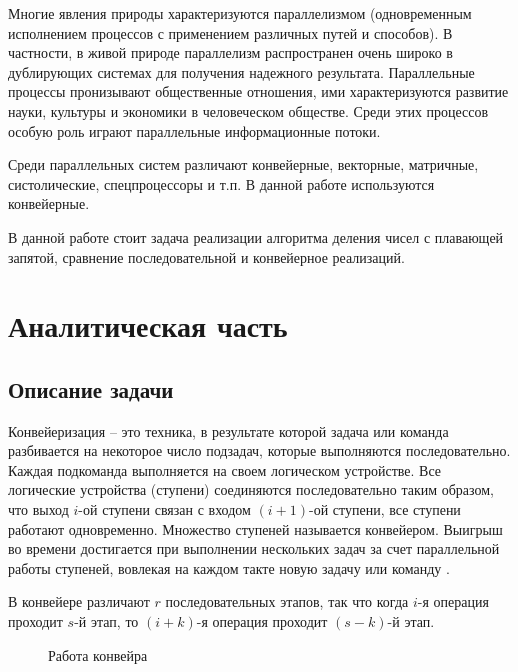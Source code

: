 \documentclass[a4paper,12pt]{article}
\begin{document}
Многие явления природы характеризуются параллелизмом (одновременным исполнением процессов с применением различных путей и способов). В частности, в живой природе параллелизм распространен очень широко в дублирующих системах для получения надежного результата. Параллельные процессы пронизывают общественные отношения, ими характеризуются развитие науки, культуры и экономики в человеческом обществе. Среди этих процессов особую роль играют параллельные информационные потоки. \cite{Conveer}

Среди параллельных систем различают конвейерные, векторные, матричные, систолические, спецпроцессоры и т.п. В данной работе используются конвейерные. \cite{Korneev}

В данной работе стоит задача реализации алгоритма деления чисел с плавающей запятой, сравнение последовательной и конвейерное реализаций.

\newpage
\section{Аналитическая часть}

\subsection{Описание задачи}

Конвейеризация – это техника, в результате которой  задача или  команда разбивается  на некоторое число подзадач, которые  выполняются последовательно. Каждая  подкоманда   выполняется на своем логическом  устройстве.    Все     логические    устройства   (ступени)  соединяются последовательно таким образом, что выход  $i$-ой   ступени   связан   с   входом   $(i+1)$-ой   ступени,  все ступени  работают  одновременно.  Множество  ступеней называется    конвейером.    Выигрыш     во    времени достигается при  выполнении  нескольких задач  за  счет параллельной   работы   ступеней,  вовлекая  на  каждом такте новую задачу или команду \cite{Conveer}.

В конвейере различают $r$ последовательных этапов, так что когда $i$-я операция
проходит $s$-й этап, то $(i+k)$-я операция проходит $(s-k)$-й этап.

\begin{figure}[H]
    \caption{Работа конвейра}
    \label{img:conveer}
\end{figure}
\end{document}
